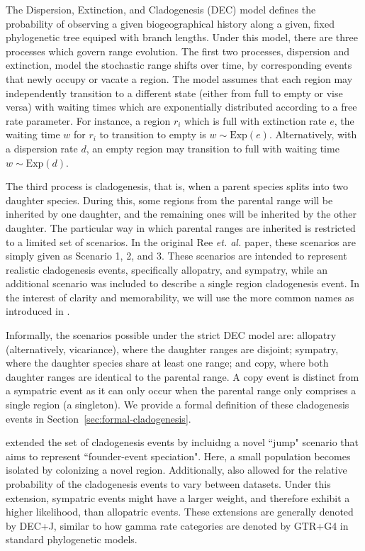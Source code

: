 \documentclass[a4paper]{article}
\begin{document}
The Dispersion, Extinction, and Cladogenesis (DEC) model defines the probability of observing a given biogeographical
history along a given, fixed phylogenetic tree equiped with branch lengths.
Under this model, there are three processes which govern range evolution.
The first two processes, dispersion and extinction, model the stochastic range shifts over time, by corresponding events that newly
occupy or vacate a region.
The model assumes that each region may independently transition to a different state (either from full to empty or
vise versa) with waiting times which are exponentially distributed according to a free rate parameter.
For instance, a region \( r_i \) which is full with extinction rate \( e \), the waiting time \( w \) for \( r_i \)
to transition to empty is \( w \sim \text{Exp}(e) \).
Alternatively, with a dispersion rate $d$, an empty region may transition to full with waiting time $w \sim \text{Exp}(d)$.

The third process is cladogenesis, that is, when a parent species splits into two daughter species.
During this, some regions from the parental range will be inherited by one daughter, and the remaining ones will be inherited by the
other daughter.
The particular way in which parental ranges are inherited is restricted to a limited set of scenarios.
In the original Ree \textit{et. al.}\cite{ALikelihoodFrReeR2005} paper, these scenarios are simply given as Scenario 1,
2, and 3.
These scenarios are intended to represent realistic cladogenesis events, specifically allopatry, and sympatry, while an
additional scenario was included to describe a single region cladogenesis event.
In the interest of clarity and memorability, we will use the more common names as introduced in \citet{ModelSelectionMatzke2014}.

Informally, the scenarios possible under the strict DEC model are: allopatry (alternatively, vicariance), where the
daughter ranges are disjoint; sympatry, where the daughter species share at least one range; and copy, where both
daughter ranges are identical to the parental range.
A copy event is distinct from a sympatric event as it can only occur when the parental range only comprises a single region
(a singleton).
We provide a formal definition of these cladogenesis events in Section~\ref{sec:formal-cladogenesis}.

\citet{ModelSelectionMatzke2014} extended the set of cladogenesis events by incluidng a novel ``jump" scenario that 
aims to represent ``founder-event speciation".
Here, a small population becomes isolated by colonizing a novel region.
Additionally, \citet{ModelSelectionMatzke2014} also allowed for the relative probability of the cladogenesis events to
vary between datasets.
Under this extension, sympatric events might have a larger weight, and therefore exhibit a higher likelihood, than
allopatric events.
These extensions are generally denoted by DEC+J, similar to how gamma rate categories are denoted by GTR+G4 in
standard phylogenetic models.
\end{document}
